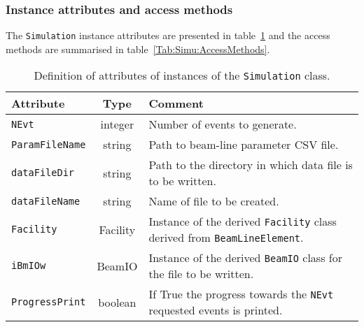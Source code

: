 \subsubsection{Instance attributes and access methods}
\label{Para:Simu:InstAttr}
\noindent
The \texttt{Simulation} instance attributes are presented in
table~\ref{Tab:Simu:Attributes} and the access methods are summarised
in table~\ref{Tab:Simu:AccessMethods}.
\begin{table}[h]
  \caption{
    Definition of attributes of instances of the \texttt{Simulation} class.
  }
  \label{Tab:Simu:Attributes}
  \begin{center}
    \begin{tabular}{|l|c|p{11cm}|}
      \hline
      \textbf{Attribute} & \textbf{Type} & \textbf{Comment}                                                                      \\
      \hline
      \texttt{NEvt}          & integer  & Number of events to generate.                                                          \\
      \texttt{ParamFileName} & string   & Path to beam-line parameter CSV file.                                                  \\
      \texttt{dataFileDir}   & string   & Path to the directory in which data file is to be written.                             \\
      \texttt{dataFileName}  & string   & Name of file to be created.                                                            \\
      \texttt{Facility}      & Facility & Instance of the derived \texttt{Facility} class derived from \texttt{BeamLineElement}. \\
      \texttt{iBmIOw}        & BeamIO   & Instance of the derived \texttt{BeamIO} class for the file to be written.              \\
      \texttt{ProgressPrint} & boolean  & If True the progress towards the \texttt{NEvt} requested events is printed.            \\
      \hline
    \end{tabular}
  \end{center}
\end{table}
